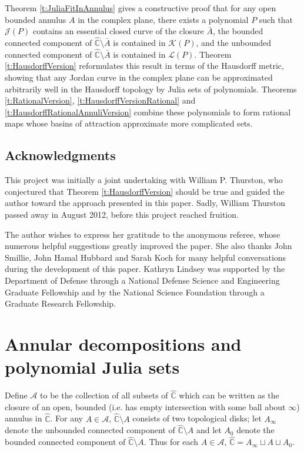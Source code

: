 \documentclass[a4paper,11pt,onecolumn]{amsart}
\theoremstyle{definition}
\begin{document}
 
 Theorem \ref{t:JuliaFitInAnnulus} gives a constructive proof that for any open bounded annulus $A$ in the complex plane, there exists a polynomial $P$ such that $\mathcal{J}(P)$ contains an essential closed curve of the closure $\bar{A}$, the bounded connected component of $\hat{\mathbb{C}} \setminus \bar{A}$ is contained in $\mathcal{K}(P)$, and the unbounded connected component of $\hat{\mathbb{C}} \setminus \bar{A}$ is contained in $\mathcal{L}(P)$.  Theorem \ref{t:HausdorffVersion} reformulates this result in terms of the Hausdorff metric, showing that any Jordan curve in the complex plane can be approximated arbitrarily well in the Hausdorff topology by Julia sets of polynomials.   Theorems \ref{t:RationalVersion}, \ref{t:HausdorffVersionRational} and \ref{t:HausdorffRationalAnnuliVersion} combine these polynomials to form rational maps whose basins of attraction approximate more complicated sets.  
  
   \subsection*{Acknowledgments}
   \medskip
     This project was initially a joint undertaking with William P. Thurston, who conjectured that Theorem \ref{t:HausdorffVersion} should be true and guided the author toward the approach presented in this paper.  Sadly, William Thurston passed away in August 2012, before this project reached fruition. 
     \medskip
  
The author wishes to express her gratitude to the anonymous referee, whose numerous helpful suggestions greatly improved the paper.   She also thanks John Smillie, John Hamal Hubbard and Sarah Koch for many helpful conversations during the development of this paper.  Kathryn Lindsey was supported by the Department of Defense through a National Defense Science and Engineering Graduate Fellowship and by the National Science Foundation through a Graduate Research Fellowship.  

\section{Annular decompositions and polynomial Julia sets}

 
 
   Define $\mathcal{A}$ to be the collection of all subsets of $\hat{\mathbb{C}}$ which can be written as the closure of an open, bounded (i.e. has empty intersection with some ball about $\infty$) annulus in $\hat{\mathbb{C}}$.   For any $A \in \mathcal{A}$, $\hat{\mathbb{C}} \setminus A$ consists of two topological disks; let $A_{\infty}$ denote the unbounded connected component of $\hat{\mathbb{C}} \setminus A$ and let $A_0$ denote the bounded connected component of $\hat{\mathbb{C}} \setminus A$.  Thus for each $A \in \mathcal{A}$, $\hat{\mathbb{C}} = A_{\infty} \sqcup A \sqcup A_0$.  
 
\end{document}
